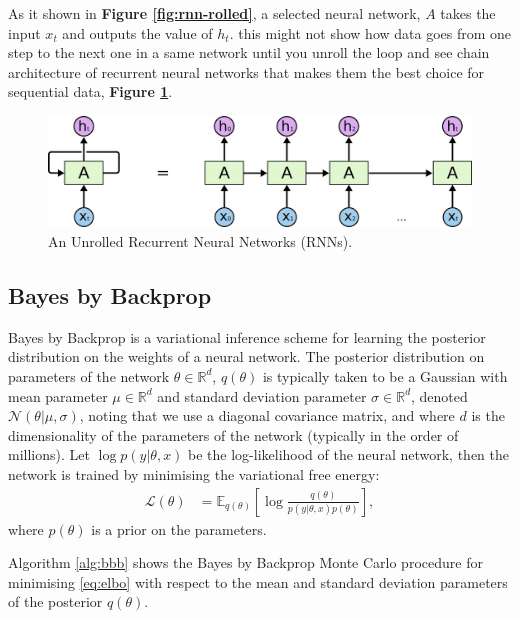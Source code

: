 As it shown in \textbf{Figure \ref{fig:rnn-rolled}}, a selected neural network, $A$ takes the input $x_t$ and outputs the value of $h_t$. this might not show how data goes from one step to the next one in a same network until you unroll the loop and see chain architecture of recurrent neural networks that makes them the best choice for sequential data, \textbf{Figure \ref{fig:rnn-unrolled}}.

\begin{figure}[p]
	\centering
	\includegraphics[scale=0.4]{./figs/rnn-unrolled}
	\caption[An Unrolled Recurrent Neural Networks]{An Unrolled Recurrent Neural Networks (RNNs).}
	\label{fig:rnn-unrolled}
\end{figure}

\subsection{Bayes by Backprop}

Bayes by Backprop \cite{Blundell2015a} is a variational inference scheme for learning the posterior distribution on the weights of a neural network.
The posterior distribution on parameters of the network $\theta \in \mathbb{R}^d$, $q(\theta)$ is typically taken to be a Gaussian with mean parameter $\mu\in \mathbb{R}^d$ and standard deviation parameter $\sigma\in \mathbb{R}^d$, denoted $\mathcal{N}(\theta|\mu,\sigma)$, noting that we use a diagonal covariance matrix, and where $d$ is the dimensionality of the parameters of the network (typically in the order of millions).
Let $\log p(y|\theta, x)$ be the log-likelihood of the neural network, then the
network is trained by minimising the variational free energy:
\begin{align}
	\label{eq:elbo}
	\mathcal{L}(\theta) &=
	\mathbb{E}_{q(\theta)}\left[\log \frac{q(\theta)}{p(y|\theta, x)p(\theta)}\right],
\end{align}
where $p(\theta)$ is a prior on the parameters.

Algorithm \ref{alg:bbb} shows the Bayes by Backprop Monte Carlo procedure for minimising \ref{eq:elbo} with respect to the mean and standard deviation parameters of the posterior $q(\theta)$.


